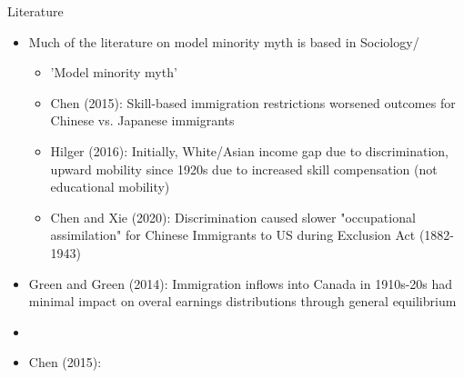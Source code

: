 \documentclass[pdf]{beamer}
\begin{document}
\begin{frame}{Literature}
    \begin{itemize}
        \item Much of the literature on model minority myth is based in Sociology/
        \begin{itemize}
            \item 'Model minority myth' 
            \item Chen (2015): Skill-based immigration restrictions worsened outcomes for Chinese vs. Japanese immigrants
            \item Hilger (2016): Initially, White/Asian income gap due to discrimination, upward mobility since 1920s due to increased skill compensation (not educational mobility)
            \item Chen and Xie (2020): Discrimination caused slower "occupational assimilation" for Chinese Immigrants to US during Exclusion Act (1882-1943)
        \end{itemize}
        \item Green and Green (2014): Immigration inflows into Canada in 1910s-20s had minimal impact on overal earnings distributions through general equilibrium
        \item 
        \item Chen (2015): 
    \end{itemize}
\end{frame}
\end{document}
